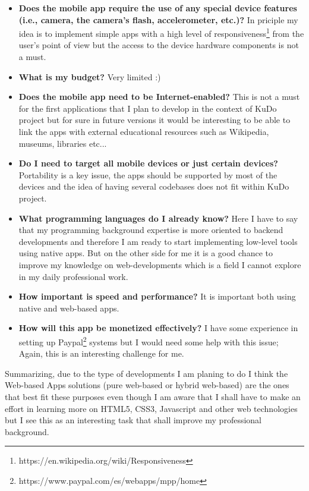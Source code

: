 \documentclass[a4paper,12pt]{book}
\begin{document}
\begin{itemize}
 \item \textbf{Does the mobile app require the use of any special device features (i.e., camera, the camera’s flash, accelerometer, etc.)?} In priciple my idea is to implement simple apps with a high level of responsiveness\footnote{https://en.wikipedia.org/wiki/Responsiveness}  from the user's point of view but the access to the device hardware components is not a must.
 \item \textbf{What is my budget?} Very limited :)
 \item \textbf{Does the mobile app need to be Internet-enabled?} This is not a must for the first applications that I plan to develop in the context of KuDo project but for sure in future versions it would be interesting to be able to link the apps with external educational resources such as Wikipedia, museums, libraries etc...
 \item \textbf{Do I need to target all mobile devices or just certain devices?} Portability is a key issue, the apps should be supported by most of the devices and the idea of having several codebases does not fit within KuDo project.
 \item \textbf{What programming languages do I already know?} Here I have to say that my programming background expertise is more oriented to backend developments and therefore I am ready to start implementing low-level tools using native apps. But on the other side for me it is a good chance to improve my knowledge on web-developments which is a field I cannot explore in my daily professional work.
 \item \textbf{How important is speed and performance?} It is important both using native and web-based apps.
 \item \textbf{How will this app be monetized effectively?} I have some experience in setting up Paypal\footnote{https://www.paypal.com/es/webapps/mpp/home}  systems but I would need some help with this issue; Again, this is an interesting challenge for me.
\end{itemize}

Summarizing, due to the type of developments I am planing to do I think the Web-based Apps solutions (pure web-based or hybrid web-based) are the ones that best fit these purposes even though I am aware that I shall have to make an effort in learning more on HTML5, CSS3, Javascript and other web technologies but I see this as an interesting task that shall improve my professional background.
\end{document}
